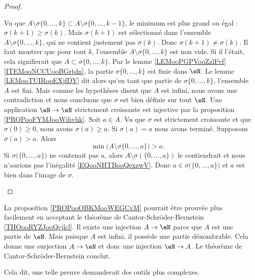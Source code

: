 \begin{proof}
\begin{subproof}
		Vu que \( A\setminus\sigma\{ 0,\ldots, k \}\subset A\setminus\sigma\{ 0,\ldots, k-1 \}\), le minimum est plus grand ou égal : \( \sigma(k+1)\geq \sigma(k)\). Mais \( \sigma(k+1)\) est sélectionné dans l'ensemble \( A\setminus\sigma\{ 0,\ldots, k \}\), qui ne contient justement pas \( \sigma(k)\). Donc \( \sigma(k+1)\neq \sigma(k)\).
		Il faut montrer que pour tout \( k\), l'ensemble \( A\setminus\sigma\{ 0,\ldots, k \}\) est non vide. Si il l'était, cela signifierait que \( A\subset \sigma\{ 0,\ldots, k \}\). Par le lemme \ref{LEMooPGPVooZzlFvf}\ref{ITEMooNCCUooBGrtdn}, la partie \( \sigma\{ 0,\ldots, k \}\) est finie dans \( \eN\). Le lemme \ref{LEMooTUIRooEXjfDY} dit alors qu'en tant que partie de \( \sigma\{ 0,\ldots, k \}\), l'ensemble \( A\) est fini. Mais comme les hypothèses disent que \( A\) est infini, nous avons une contradiction et nous concluons que \( \sigma\) est bien définie sur tout \( \eN\).
		Une application \( \eN\to \eN\) strictement croissante est injective par la proposition \ref{PROPooFYMJooWihvhk}.
		Soit \( a\in A\). Vu que \( \sigma\) est strictement croissante et que \( \sigma(0)\geq 0\), nous avons \( \sigma(a)\geq a\). Si \( \sigma(a)=a\) nous avons terminé. Supposons \( \sigma(a)>a\). Alors
		\begin{equation}        \label{EQooNHTBooQexzwV}
			\min\big( A\setminus\sigma\{ 0,\ldots, a \} \big)>a.
		\end{equation}
		Si \( \sigma\big( \{ 0,\ldots, a \} \big)\) ne contenait pas \( a\), alors \( A\setminus \sigma(\{ 0,\ldots, a \})\) le contiendrait et nous n'aurions pas l'inégalité \eqref{EQooNHTBooQexzwV}. Donc \( a\in \sigma\big( \{ 0,\ldots, a \} \big)\) et \( a\) est bien dans l'image de \( \sigma\).
	\end{subproof}
\end{proof}

\begin{normaltext}	\label{NORMooPartieDenombrableParCantorBernstein}
	La proposition \ref{PROPooOBKMooWEGCvM} pourrait être prouvée plus facilement en acceptant le théorème de Cantor-Schröder-Bernstein \ref{THOooRYZJooQcjlcl}. Il existe une injection \( A\to \eN\) parce que \( A\) est une partie de \( \eN\). Mais puisque \( A\) est infini, il possède une partie dénombrable. Cela donne une surjection \( A\to \eN\) et donc une injection \( \eN\to A\). Le théorème de Cantor-Schröder-Bernstein conclut.

	Cela dit, une telle preuve demanderait des outils plus complexes.
\end{normaltext}



